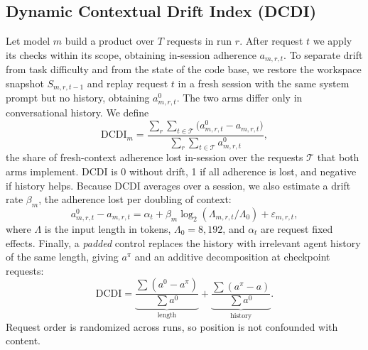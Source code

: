 \documentclass[10pt,conference]{IEEEtran}
\begin{document}
\subsection{Dynamic Contextual Drift Index (DCDI)}
Let model $m$ build a product over $T$ requests in run $r$. After request $t$ we apply its checks within its scope, obtaining in-session adherence $a_{m,r,t}$. To separate drift from task difficulty and from the state of the code base, we restore the workspace snapshot $S_{m,r,t-1}$ and replay request $t$ in a fresh session with the same system prompt but no history, obtaining $a^{0}_{m,r,t}$. The two arms differ only in conversational history. We define
\begin{equation}
\mathrm{DCDI}_m=\frac{\sum_{r}\sum_{t\in\mathcal{T}}\big(a^{0}_{m,r,t}-a_{m,r,t}\big)}{\sum_{r}\sum_{t\in\mathcal{T}}a^{0}_{m,r,t}},
\end{equation}
the share of fresh-context adherence lost in-session over the requests $\mathcal{T}$ that both arms implement. DCDI is 0 without drift, 1 if all adherence is lost, and negative if history helps. Because DCDI averages over a session, we also estimate a drift rate $\beta_m$, the adherence lost per doubling of context:
\begin{equation}
a^{0}_{m,r,t}-a_{m,r,t}=\alpha_t+\beta_m\log_2(\Lambda_{m,r,t}/\Lambda_0)+\varepsilon_{m,r,t},
\end{equation}
where $\Lambda$ is the input length in tokens, $\Lambda_0=8{,}192$, and $\alpha_t$ are request fixed effects. Finally, a \emph{padded} control replaces the history with irrelevant agent history of the same length, giving $a^{\pi}$ and an additive decomposition at checkpoint requests:
\begin{equation}
\mathrm{DCDI}=\underbrace{\frac{\sum(a^{0}-a^{\pi})}{\sum a^{0}}}_{\text{length}}+\underbrace{\frac{\sum(a^{\pi}-a)}{\sum a^{0}}}_{\text{history}}.
\end{equation}
Request order is randomized across runs, so position is not confounded with content.
\end{document}
